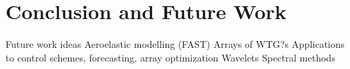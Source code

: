 \section{Conclusion and Future Work}
Future work ideas
Aeroelastic modelling (FAST)
Arrays of WTG?s
Applications to control schemes, forecasting, array optimization
Wavelets
Spectral methods



